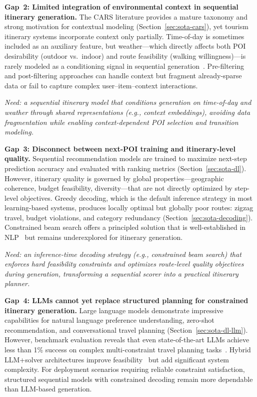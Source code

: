 \medskip

\textbf{Gap~2: Limited integration of environmental context in sequential itinerary generation.}
The CARS literature provides a mature taxonomy and strong motivation for contextual modeling (Section~\ref{sec:sota-cars}), yet tourism itinerary systems incorporate context only partially. Time-of-day is sometimes included as an auxiliary feature, but weather---which directly affects both POI desirability (outdoor vs.\ indoor) and route feasibility (walking willingness)---is rarely modeled as a conditioning signal in sequential generation~\cite{villegas2018cars, mateos2025carsslr}. Pre-filtering and post-filtering approaches can handle context but fragment already-sparse data or fail to capture complex user--item--context interactions.

\textit{Need: a sequential itinerary model that conditions generation on time-of-day and weather through shared representations (e.g., context embeddings), avoiding data fragmentation while enabling context-dependent POI selection and transition modeling.}

\medskip

\textbf{Gap~3: Disconnect between next-POI training and itinerary-level quality.}
Sequential recommendation models are trained to maximize next-step prediction accuracy and evaluated with ranking metrics (Section~\ref{sec:sota-dl}). However, itinerary quality is governed by global properties---geographic coherence, budget feasibility, diversity---that are not directly optimized by step-level objectives. Greedy decoding, which is the default inference strategy in most learning-based systems, produces locally optimal but globally poor routes: zigzag travel, budget violations, and category redundancy (Section~\ref{sec:sota-decoding}). Constrained beam search offers a principled solution that is well-established in NLP~\cite{hokamp2017lcd, post2018fast} but remains underexplored for itinerary generation.

\textit{Need: an inference-time decoding strategy (e.g., constrained beam search) that enforces hard feasibility constraints and optimizes route-level quality objectives during generation, transforming a sequential scorer into a practical itinerary planner.}

\medskip

\textbf{Gap~4: LLMs cannot yet replace structured planning for constrained itinerary generation.}
Large language models demonstrate impressive capabilities for natural language preference understanding, zero-shot recommendation, and conversational travel planning (Section~\ref{sec:sota-dl-llm}). However, benchmark evaluation reveals that even state-of-the-art LLMs achieve less than 1\% success on complex multi-constraint travel planning tasks~\cite{xie2024travelplanning}. Hybrid LLM+solver architectures improve feasibility~\cite{fan2024travelagent, kambhampati2024llmmodulo} but add significant system complexity. For deployment scenarios requiring reliable constraint satisfaction, structured sequential models with constrained decoding remain more dependable than LLM-based generation.

